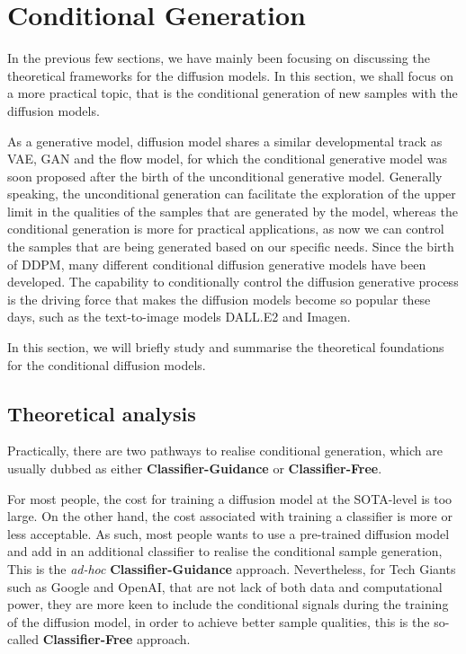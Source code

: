 \section{Conditional Generation}

In the previous few sections, we have mainly been focusing on discussing the theoretical frameworks for the diffusion models. In this section, we shall focus on a more practical topic, that is the conditional generation of new samples with the diffusion models. 

As a generative model, diffusion model shares a similar developmental track as VAE, GAN and the flow model, for which the conditional generative model was soon proposed after the birth of the unconditional generative model. Generally speaking, the unconditional generation can facilitate the exploration of the upper limit in the qualities of the samples that are generated by the model, whereas the conditional generation is more for practical applications, as now we can control the samples that are being generated based on our specific needs. Since the birth of DDPM, many different conditional diffusion generative models have been developed. The capability to conditionally control the diffusion generative process is the driving force that makes the diffusion models become so popular these days, such as the text-to-image models DALL.E2 and Imagen.

In this section, we will briefly study and summarise the theoretical foundations for the conditional diffusion models.

\subsection{Theoretical analysis}

Practically, there are two pathways to realise conditional generation, which are usually dubbed as either \textbf{Classifier-Guidance} or \textbf{Classifier-Free}. 

For most people, the cost for training a diffusion model at the SOTA-level is too large. On the other hand, the cost associated with training a classifier is more or less acceptable. As such, most people wants to use a pre-trained diffusion model and add in an additional classifier to realise the conditional sample generation, This is the \emph{ad-hoc} \textbf{Classifier-Guidance} approach. Nevertheless, for Tech Giants such as Google and OpenAI, that are not lack of both data and computational power, they are more keen to include the conditional signals during the training of the diffusion model, in order to achieve better sample qualities, this is the so-called \textbf{Classifier-Free} approach.

